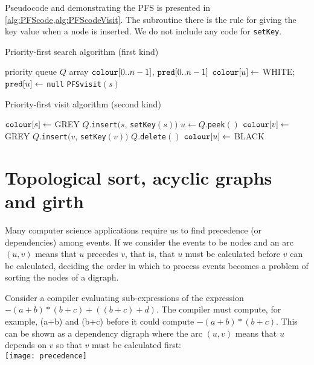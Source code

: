 Pseudocode  and  demonstrating the PFS is presented in \cref{alg:PFScode,alg:PFScodeVisit}. 
The subroutine  there is the rule for giving the key value when a node is inserted. 
We do not include any code for \texttt{setKey}.

\begin{algorithm}[H]
  \caption{Priority-first search algorithm (first kind)}
  \label{alg:PFScode}
\begin{algorithmic}[1]
	\State priority queue $Q$  
	\State array $\operatorname{\text{\texttt{colour}}}[0..n-1]$, $\operatorname{\text{\texttt{pred}}}[0..n-1]$
		\State $\operatorname{\text{\texttt{colour}}}[u] \gets $ WHITE; $\operatorname{\text{\texttt{pred}}}[u] \gets $ \texttt{null}
	\EndFor
			\State \texttt{PFSvisit}$(s)$
		\EndIf
	\EndFor
	\State \Return{$\pred$}
\EndFunction
\end{algorithmic}
\end{algorithm}

\begin{algorithm}[H]
  \caption{Priority-first visit algorithm (second kind)}
  \label{alg:PFScodeVisit}
  \begin{algorithmic}[1]
	\State $\operatorname{\text{\texttt{colour}}}[s] \gets $ GREY 
	\State $Q$.\texttt{insert}$(s$, \texttt{setKey}$(s))$
		\State $u \gets Q$.\texttt{peek}$()$
			\State $\operatorname{\text{\texttt{colour}}}[v] \gets $ GREY
			\State $Q$.\texttt{insert}$(v$, \texttt{setKey}$(v))$
		\Else
			\State $Q$.\texttt{delete}$()$
			\State $\operatorname{\text{\texttt{colour}}}[u] \gets$ BLACK
		\EndIf
	\EndWhile
\EndFunction
\end{algorithmic}
\end{algorithm}


\chapter{Topological sort, acyclic graphs and girth} %
Many computer science applications require us to find precedence (or dependencies) among events. 
If we consider the events to be nodes and an arc $(u,v)$ means that $u$ precedes $v$, that is, 
that $u$ must be calculated before $v$ can be calculated, 
deciding the order in which to process events becomes a problem of sorting the nodes of a digraph.

\begin{Boxample}[0]
Consider a compiler evaluating sub-expressions of the expression $-(a+b) * (b+c) + ((b+c)+d)$.  
The compiler must compute, for example, (a+b) and (b+c) before it could compute $-(a+b) * (b+c)$. 
This can be shown as a dependency digraph where the arc $(u,v)$ means 
that $u$ depends on $v$ so that $v$ must be calculated first:\\
\texttt{[image: precedence]}
\end{Boxample}

